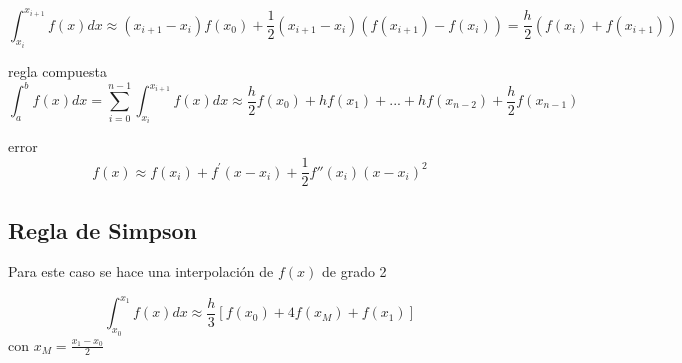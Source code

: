\begin{equation*}
  \int_{x_i}^{x_{i+1}} f(x)dx \approx (x_{i+1}-x_i)f(x_0) + \frac{1}{2}(x_{i+1}-x_i)(f(x_{i+1})-f(x_i))= \frac{h}{2}(f(x_i)+f(x_{i+1}))
\end{equation*}


regla compuesta
\begin{equation*}
  \int_a^b f(x)dx= \sum_{i=0}^{n-1} \int_{x_i}^{x_{i+1}} f(x)dx \approx \frac{h}{2}f(x_0) +hf(x_1) +...+hf(x_{n-2}) +\frac{h}{2}f(x_{n-1})
\end{equation*}

error
\begin{equation*}
  f(x) \approx f(x_i) + f^\prime (x-x_i) + \frac{1}{2}f''(x_i) (x-x_i)^2
\end{equation*}

 \subsection{Regla de Simpson}
Para este caso se hace una interpolación de $f(x)$ de grado 2

\begin{equation*}
  \int_{x_0}^{x_1} f(x) dx \approx \frac{h}{3} [f(x_0)+4f(x_M)+f(x_1)]
\end{equation*}
 con $x_M=\frac{x_1-x_0}{2}$
 

